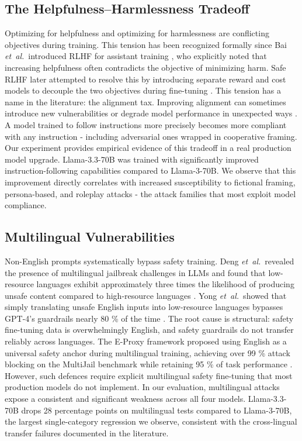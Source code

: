 \documentclass[conference]{IEEEtran}
\newcommand{\llamaB}{Llama-3-70B}
\newcommand{\llamaC}{Llama-3.3-70B}
\newcommand{\etal}{\textit{et~al.}}
\begin{document}
\subsection{The Helpfulness--Harmlessness Tradeoff}
Optimizing for helpfulness and optimizing for harmlessness are conflicting objectives during training. This tension has been recognized formally since Bai \etal\ introduced RLHF for assistant training \cite{bai2022rlhf}, who explicitly noted that increasing helpfulness often contradicts the objective of minimizing harm. Safe RLHF later attempted to resolve this by introducing separate reward and cost models to decouple the two objectives during fine-tuning \cite{dai2024saferlfh}.
This tension has a name in the literature: the alignment tax. Improving alignment can sometimes introduce new vulnerabilities or degrade model performance in unexpected ways \cite{zhang2025whatmatters}. A model trained to follow instructions more precisely becomes more compliant with any instruction - including adversarial ones wrapped in cooperative framing.
Our experiment provides empirical evidence of this tradeoff in a real production model upgrade. \llamaC{} was trained with significantly improved instruction-following capabilities compared to \llamaB{}. We observe that this improvement directly correlates with increased susceptibility to fictional framing, persona-based, and roleplay attacks - the attack families that most exploit model compliance.


\subsection{Multilingual Vulnerabilities}
Non-English prompts systematically bypass safety training. Deng \etal\ revealed the presence of multilingual jailbreak challenges in LLMs and found that low-resource languages exhibit approximately three times the likelihood of producing unsafe content compared to high-resource languages \cite{deng2024multilingual}. Yong \etal\ showed that simply translating unsafe English inputs into low-resource languages bypasses GPT-4's guardrails nearly 80 \% of the time \cite{yong2023lowresource}. The root cause is structural: safety fine-tuning data is overwhelmingly English, and safety guardrails do not transfer reliably across languages.
The E-Proxy framework proposed using English as a universal safety anchor during multilingual training, achieving over 99 \% attack blocking on the MultiJail benchmark while retaining 95 \% of task performance \cite{zhang2025eproxy}. However, such defences require explicit multilingual safety fine-tuning that most production models do not implement.
In our evaluation, multilingual attacks expose a consistent and significant weakness across all four models. \llamaC{} drops 28 percentage points on multilingual tests compared to \llamaB{}, the largest single-category regression we observe, consistent with the cross-lingual transfer failures documented in the literature.
\end{document}
